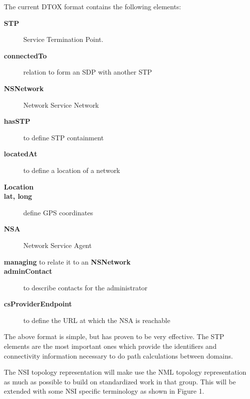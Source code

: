 \documentclass{article}
\begin{document}
 The current DTOX format contains the following elements:

 \begin{description}

   \item[\textbf{STP}] Service Termination Point.

   \item[\textbf{connectedTo}]  relation to form an SDP 
  with another STP

   \item[\textbf{NSNetwork}]  Network Service Network

   \item[\textbf{hasSTP }] to define STP containment

   \item[\textbf{locatedAt}]  to define a location of a network
   \item[\textbf{Location}]

   \item[\textbf{lat, long}]  define GPS coordinates

   \item[\textbf{NSA}]  Network Service Agent

   \item[\textbf{managing}  to relate it to an  \textbf{NSNetwork}]

   \item[\textbf{adminContact}]  to describe contacts for the administrator

   \item[\textbf{csProviderEndpoint}]  to define the URL at which the NSA is reachable

 \end{description}


 The above format is simple, but has proven to be very effective. 
The STP elements are the most important ones which provide the identifiers and 
connectivity information necessary to do path calculations between domains.

 The NSI topology representation will make use the NML topology 
representation as much as possible to build on standardized work in that group. 
This will be extended with some NSI specific terminology as shown in Figure 1.
\end{document}
